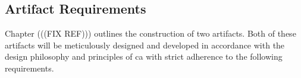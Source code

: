 \subsection{Artifact Requirements} \label{sec_artifact_requirements}

Chapter (((FIX REF))) outlines the construction of two artifacts. Both
of these artifacts will be meticulously designed and developed in accordance with the
design philosophy and principles of \gls{ca} with strict adherence to the following
requirements.





